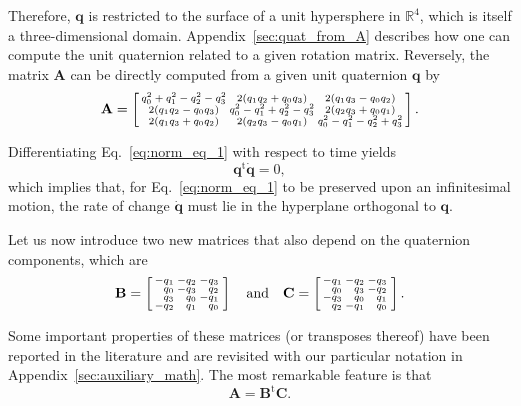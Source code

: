 \documentclass[aip,jcp,reprint,amsmath,amssymb]{revtex4-1}
\makeatletter
\newcommand{\mt}[1]{\boldsymbol{\mathbf{#1}}}           %
\newcommand{\vt}[1]{\boldsymbol{\mathbf{#1}}}           %
\newcommand{\tr}[1]{#1^\text{t}}                               %
\newenvironment{smallarray}[1]
{\null\,\vcenter\bgroup\scriptsize
	\renewcommand{\arraystretch}{0.7}
	\arraycolsep=.13885em
	\hbox\bgroup$\array{@{}#1@{}}}
{\endarray$\egroup\egroup\,\null}
\makeatother
\begin{document}
Therefore, $\vt q$ is restricted to the surface of a unit hypersphere in $\mathbb{R}^4$, which is itself a three-dimensional domain. Appendix~\ref{sec:quat_from_A} describes how one can compute the unit quaternion related to a given rotation matrix. Reversely, the matrix $\mt A$ can be directly computed from a given unit quaternion $\vt q$ by\cite{Allen1989,Miller2002}
\begin{equation}
\label{eq:A_from_q}
\mt A = \left[ \begin{smallarray}{ccc}
q_0^2 + q_1^2 - q_2^2 - q_3^2 & 2(q_1 q_2 + q_0 q_3)          & 2(q_1 q_3 - q_0 q_2) \\
2(q_1 q_2 - q_0 q_3)          & q_0^2 - q_1^2 + q_2^2 - q_3^2 & 2(q_2 q_3 + q_0 q_1) \\
2(q_1 q_3 + q_0 q_2)          & 2(q_2 q_3 - q_0 q_1)          & q_0^2 - q_1^2 - q_2^2 + q_3^2  
\end{smallarray} \right].
\end{equation}

Differentiating Eq.~\ref{eq:norm_eq_1} with respect to time yields
\begin{equation}
\label{eq:diff_qTq}
\tr{\vt q}\dot{\vt q} = 0,
\end{equation}
which implies that, for Eq.~\ref{eq:norm_eq_1} to be preserved upon an infinitesimal motion, the rate of change $\dot{\vt q}$ must lie in the hyperplane orthogonal to $\vt q$.

Let us now introduce two new matrices that also depend on the quaternion components, which are
\begin{equation}
\label{eq:def_B_and_C}
\mt B = \left[
\begin{smallarray}{rrrr}
-q_1 & -q_2 & -q_3 \\
 q_0 & -q_3 &  q_2 \\
 q_3 &  q_0 & -q_1 \\
-q_2 &  q_1 &  q_0
\end{smallarray}
\right]
\quad \text{and} \quad
\mt C = \left[
\begin{smallarray}{rrrr}
-q_1 & -q_2 & -q_3 \\
 q_0 &  q_3 & -q_2 \\
-q_3 &  q_0 &  q_1 \\
 q_2 & -q_1 &  q_0
\end{smallarray}
\right].
\end{equation}

Some important properties of these matrices (or transposes thereof) have been reported in the literature\cite{Haug1989, Shuster1993, Dichmann1999, Ravishankar2004, Nielsen2012} and are revisited with our particular notation in Appendix~\ref{sec:auxiliary_math}. The most remarkable feature is that
\begin{equation}
\label{eq:factorization_of_A}
{\mt A} = \tr{\mt B}{\mt C}.
\end{equation}
\end{document}

